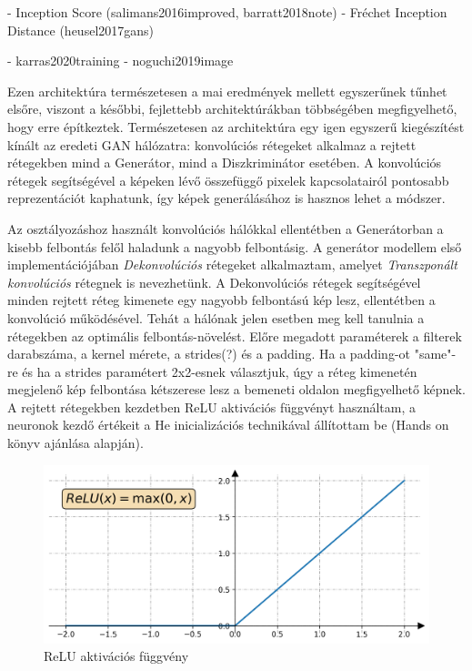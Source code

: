





- Inception Score (salimans2016improved, barratt2018note)
- Fréchet Inception Distance (heusel2017gans)

- karras2020training
- noguchi2019image

Ezen architektúra természetesen a mai eredmények mellett egyszerűnek tűnhet elsőre, viszont a későbbi, fejlettebb architektúrákban többségében megfigyelhető, hogy erre építkeztek. Természetesen az architektúra egy igen egyszerű kiegészítést kínált az eredeti GAN hálózatra: konvolúciós rétegeket alkalmaz a rejtett rétegekben mind a Generátor, mind a Diszkriminátor esetében. A konvolúciós rétegek segítségével a képeken lévő összefüggő pixelek kapcsolatairól pontosabb reprezentációt kaphatunk, így képek generálásához is hasznos lehet a módszer. 

Az osztályozáshoz használt konvolúciós hálókkal ellentétben a Generátorban a kisebb felbontás felől haladunk a nagyobb felbontásig.
A generátor modellem első implementációjában \textit{Dekonvolúciós} rétegeket alkalmaztam, amelyet \textit{Transzponált konvolúciós} rétegnek is nevezhetünk. A Dekonvolúciós rétegek segítségével minden rejtett réteg kimenete egy nagyobb felbontású kép lesz, ellentétben a konvolúció működésével. Tehát a hálónak jelen esetben meg kell tanulnia a rétegekben az optimális felbontás-növelést. Előre megadott paraméterek a filterek darabszáma, a kernel mérete, a strides(?) és a padding. Ha a padding-ot "same"-re és ha a strides paramétert 2x2-esnek választjuk, úgy a réteg kimenetén megjelenő kép felbontása kétszerese lesz a bemeneti oldalon megfigyelhető képnek. A rejtett rétegekben kezdetben ReLU aktivációs függvényt használtam, a neuronok kezdő értékeit a He inicializációs technikával állítottam be (Hands on könyv ajánlása alapján).

\begin{figure}[h]
\centering
\includegraphics[width=12cm]{images/relu.png}
\caption{ReLU aktivációs függvény}
\label{fig:relu}
\end{figure}

